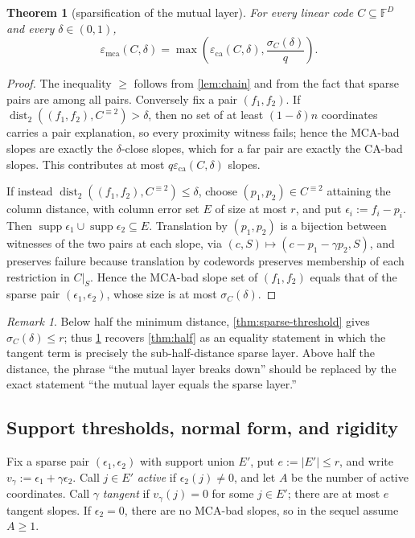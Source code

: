\documentclass[11pt]{amsart}
\newtheorem{theorem}{Theorem}[section]
\theoremstyle{definition}
\theoremstyle{remark}
\newtheorem{remark}[remark]{Remark}
\newcommand{\F}{\mathbb{F}}
\newcommand{\dist}{\operatorname{dist}}
\newcommand{\supp}{\operatorname{supp}}
\newcommand{\eca}{\varepsilon_{\mathrm{ca}}}
\newcommand{\emca}{\varepsilon_{\mathrm{mca}}}
\begin{document}
\begin{theorem}[sparsification of the mutual layer]\label{thm:sparsify}
For every linear code $C\subseteq\F^D$ and every $\delta\in(0,1)$,
\[
        \emca(C,\delta)=\max\left(\eca(C,\delta),\frac{\sigma_C(\delta)}q\right).
\]
\end{theorem}

\begin{proof}
The inequality $\ge$ follows from \cref{lem:chain} and from the fact that sparse pairs are among all pairs.  Conversely fix a pair $(f_1,f_2)$.  If $\dist_2((f_1,f_2),C^{\equiv2})>\delta$, then no set of at least $(1-\delta)n$ coordinates carries a pair explanation, so every proximity witness fails; hence the MCA-bad slopes are exactly the $\delta$-close slopes, which for a far pair are exactly the CA-bad slopes.  This contributes at most $q\eca(C,\delta)$ slopes.

If instead $\dist_2((f_1,f_2),C^{\equiv2})\le\delta$, choose $(p_1,p_2)\in C^{\equiv2}$ attaining the column distance, with column error set $E$ of size at most $r$, and put $\epsilon_i:=f_i-p_i$.  Then $\supp\epsilon_1\cup\supp\epsilon_2\subseteq E$.  Translation by $(p_1,p_2)$ is a bijection between witnesses of the two pairs at each slope, via $(c,S)\mapsto(c-p_1-\gamma p_2,S)$, and preserves failure because translation by codewords preserves membership of each restriction in $C|_S$.  Hence the MCA-bad slope set of $(f_1,f_2)$ equals that of the sparse pair $(\epsilon_1,\epsilon_2)$, whose size is at most $\sigma_C(\delta)$.
\end{proof}

\begin{remark}\label{rem:sparsify-recover}
Below half the minimum distance, \cref{thm:sparse-threshold} gives $\sigma_C(\delta)\le r$; thus \cref{thm:sparsify} recovers \cref{thm:half} as an equality statement in which the tangent term is precisely the sub-half-distance sparse layer.  Above half the distance, the phrase ``the mutual layer breaks down'' should be replaced by the exact statement ``the mutual layer equals the sparse layer.''
\end{remark}

\subsection{Support thresholds, normal form, and rigidity}

Fix a sparse pair $(\epsilon_1,\epsilon_2)$ with support union $E'$, put $e:=|E'|\le r$, and write $v_\gamma:=\epsilon_1+\gamma\epsilon_2$.  Call $j\in E'$ \emph{active} if $\epsilon_2(j)\ne0$, and let $A$ be the number of active coordinates.  Call $\gamma$ \emph{tangent} if $v_\gamma(j)=0$ for some $j\in E'$; there are at most $e$ tangent slopes.  If $\epsilon_2=0$, there are no MCA-bad slopes, so in the sequel assume $A\ge1$.
\end{document}

